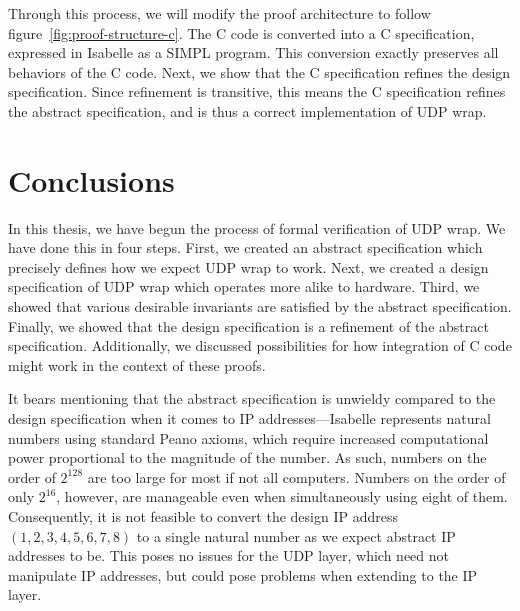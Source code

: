 \documentclass[twoside]{memoir}
\begin{document}
Through this process, we will modify the proof architecture to follow figure~\ref{fig:proof-structure-c}.
The C code is converted into a C specification, expressed in Isabelle as a SIMPL program.
This conversion exactly preserves all behaviors of the C code.
Next, we show that the C specification refines the design specification.
Since refinement is transitive, this means the C specification refines the abstract specification,
and is thus a correct implementation of UDP wrap.

\chapter{Conclusions}
In this thesis, we have begun the process of formal verification of UDP wrap.
We have done this in four steps.
First, we created an abstract specification which precisely defines
how we expect UDP wrap to work.
Next, we created a design specification of UDP wrap which operates more alike to hardware.
Third, we showed that various desirable invariants are satisfied by the abstract specification.
Finally, we showed that the design specification is a refinement of the abstract specification.
Additionally, we discussed possibilities for how integration of C code might work in the
context of these proofs.

It bears mentioning that the abstract specification is unwieldy
compared to the design specification
when it comes to IP addresses---Isabelle represents natural numbers using standard
Peano axioms,
which require increased computational power proportional to the magnitude of the number.
As such, numbers on the order of $2^{128}$ are too large for most if not all computers.
Numbers on the order of only $2^{16}$, however, are manageable even when simultaneously
using eight of them.
Consequently, it is not feasible to convert the design IP address
$(1,2,3,4,5,6,7,8)$ to a single natural number as we expect abstract IP addresses
to be.
This poses no issues for the UDP layer, which need not manipulate IP addresses,
but could pose problems when extending to the IP layer.
\end{document}
